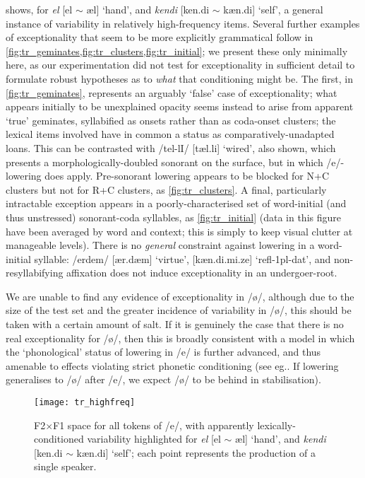  shows, for \emph{el} [el $\sim$ \ae l] `hand', and \emph{kendi} [ken.di $\sim$ k\ae n.di] `self', a general instance of variability in relatively high-frequency items. Several further examples of exceptionality that seem to be more explicitly grammatical follow in \cref{fig:tr_geminates,fig:tr_clusters,fig:tr_initial}; we present these only minimally here, as our experimentation did not test for exceptionality in sufficient detail to formulate robust hypotheses as to \emph{what} that conditioning might be. The first, in \cref{fig:tr_geminates}, represents an arguably `false' case of exceptionality; what appears initially to be unexplained opacity seems instead to arise from apparent `true' geminates, syllabified as onsets rather than as coda-onset clusters; the lexical items involved have in common a status as comparatively-unadapted loans. This can be contrasted with /tel-lI/ [t\ae l.li] `wired', also shown, which presents a morphologically-doubled sonorant on the surface, but in which /e/-lowering does apply. Pre-sonorant lowering appears to be blocked for N+C clusters but not for R+C clusters, as \cref{fig:tr_clusters}. A final, particularly intractable exception appears in a poorly-characterised set of word-initial (and thus unstressed) sonorant-coda syllables, as \cref{fig:tr_initial} (data in this figure have been averaged by word and context; this is simply to keep visual clutter at manageable levels). There is no \emph{general} constraint against lowering in a word-initial syllable: /erdem/ [\ae r.d\ae m] `virtue', [kæn.di.mi.ze] `{\sc refl-1pl-dat}', and non-resyllabifying affixation does not induce exceptionality in an undergoer-root.

We are unable to find any evidence of exceptionality in /ø/, although due to the size of the test set and the greater incidence of variability in /ø/, this should be taken with a certain amount of salt. If it is genuinely the case that there is no real exceptionality for /ø/, then this is broadly consistent with a model in which the `phonological' status of lowering in /e/ is further advanced, and thus amenable to effects violating strict phonetic conditioning (see eg.\citealt{BermudezOtero2015}. If lowering generalises to /\o/ after /e/, we expect /\o/ to be behind in stabilisation).

\begin{figure}[ht]
  \centering
  \texttt{[image: tr\_highfreq]}
  \caption[F2$\times$F1 space for all tokens of /e/; sporadic, lexical variability.]{F2$\times$F1 space for all tokens of /e/, with apparently lexically-conditioned variability highlighted for \emph{el} [el $\sim$ \ae l] `hand', and \emph{kendi} [ken.di $\sim$ k\ae n.di] `self'; each point represents the production of a single speaker.}
  \label{fig:highfreq}
\end{figure}

